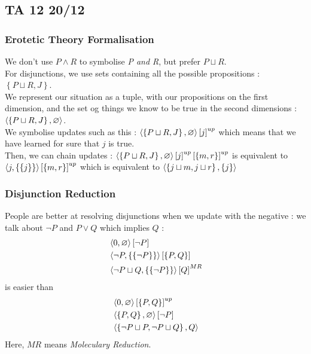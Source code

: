 \documentclass{cours}
\begin{document}
\subsection{TA 12 20/12}
\subsubsection{Erotetic Theory Formalisation}
We don't use $P \land R$ to symbolise \textsl{P and R}, but prefer $P\sqcup R$. \\
For disjunctions, we use sets containing all the possible propositions : $\left\{P \sqcup R, J\right\}$. \\
We represent our situation as a tuple, with our propositions on the first dimension, and the set og things we know to be true in the second dimensions : $\left\langle \left\{P \sqcup R, J\right\}, \varnothing \right\rangle$. \\
We symbolise updates such as this : $\left\langle \left\{P \sqcup R, J\right\}, \varnothing \right\rangle\left[j\right]^{up}$ which means that we have learned for sure that $j$ is true. \\
Then, we can chain updates : $\left\langle \left\{P \sqcup R, J\right\}, \varnothing \right\rangle\left[j\right]^{up}\left[\left\{m, r\right\}\right]^{up}$ is equivalent to $\left\langle j, \left\{\left\{j\right\}\right\} \right\rangle\left[\left\{m, r\right\}\right]^{up}$ which is equivalent to $\left\langle \left\{j\sqcup m, j \sqcup r\right\}, \{j\} \right\rangle$

\subsubsection{Disjunction Reduction}
People are better at resolving disjunctions when we update with the negative : we talk about $\lnot P$ and $P \lor Q$ which implies $Q$ :
\[
    \begin{aligned}
         & \left\langle 0, \varnothing \right\rangle\left[\lnot P\right]                                           \\
         & \left\langle \lnot P, \left\{\{\lnot P\}\right\} \right\rangle\left[\left\{P, Q\right\}\right]        \\
         & \left\langle \lnot P \sqcup Q, \left\{\left\{\lnot P\right\}\right\} \right\rangle\left[Q\right]^{MR}
    \end{aligned}
\]
is easier than
\[
    \begin{aligned}
         & \left\langle 0, \varnothing \right\rangle\left[\left\{P, Q\right\}\right]^{up}    \\
         & \left\langle \left\{P, Q\right\}, \varnothing \right\rangle[\lnot P]              \\
         & \left\langle \left\{\lnot P \sqcup P, \lnot P \sqcup Q\right\}, Q \right\rangle
    \end{aligned}
\]
Here, $MR$ means \textit{Moleculary Reduction}.
\end{document}
